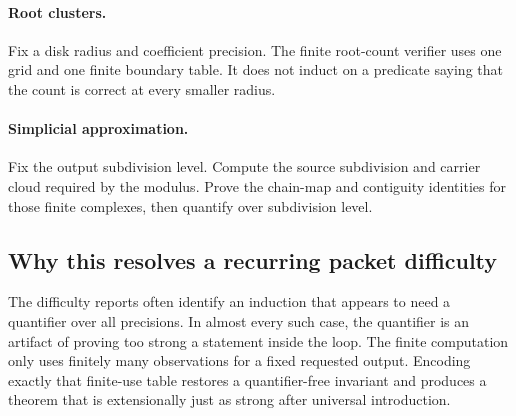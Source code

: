\paragraph{Root clusters.}
Fix a disk radius and coefficient precision.  The finite root-count verifier
uses one grid and one finite boundary table.  It does not induct on a predicate
saying that the count is correct at every smaller radius.

\paragraph{Simplicial approximation.}
Fix the output subdivision level.  Compute the source subdivision and carrier
cloud required by the modulus.  Prove the chain-map and contiguity identities
for those finite complexes, then quantify over subdivision level.

\subsection{Why this resolves a recurring packet difficulty}

The difficulty reports often identify an induction that appears to need a
quantifier over all precisions.  In almost every such case, the quantifier is
an artifact of proving too strong a statement inside the loop.  The finite
computation only uses finitely many observations for a fixed requested
output.  Encoding exactly that finite-use table restores a quantifier-free
invariant and produces a theorem that is extensionally just as strong after
universal introduction.

